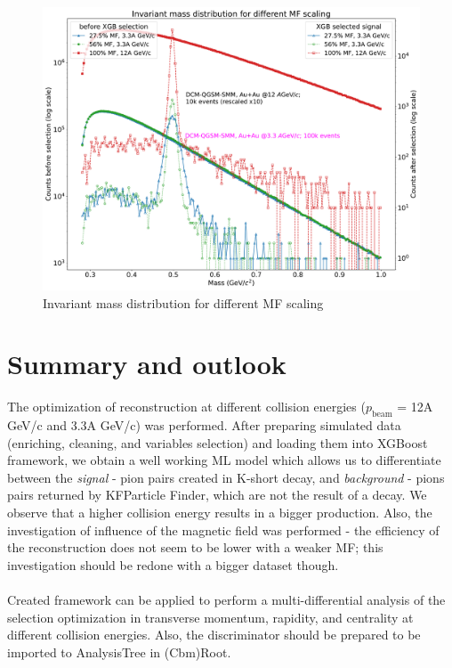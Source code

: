 \documentclass[12pt,a4paper]{report}
\begin{document}
\begin{figure}[h!]
 \centering
    \includegraphics[width=\textwidth]{images/mf0log.pdf} 
    \vspace{0.1cm}
    \caption{Invariant mass distribution for different MF scaling}
    \label{mf}
\end{figure}

\chapter{Summary and outlook}
The optimization of \PKshort reconstruction at different collision energies ($p_{\text{beam}}$ = 12A GeV/c and 3.3A GeV/c) was performed. After preparing simulated data (enriching, cleaning, and variables selection) and loading them into XGBoost framework, we obtain a well working ML model which allows us to differentiate between the \emph{signal} - pion pairs created in K-short decay, and \emph{background} - pions pairs returned by KFParticle Finder, which are not the result of a \PKshort decay. We observe that a higher collision energy results in a bigger \PKshort production. Also, the investigation of influence of the magnetic field was performed - the efficiency of the reconstruction does not seem to be lower with a weaker MF; this investigation should be redone with a bigger dataset though.\\\\
Created framework can be applied to perform a multi-differential analysis of the selection optimization in transverse momentum, rapidity, and centrality at different collision energies. Also, the discriminator should be prepared to be imported to AnalysisTree in (Cbm)Root.
\end{document}
